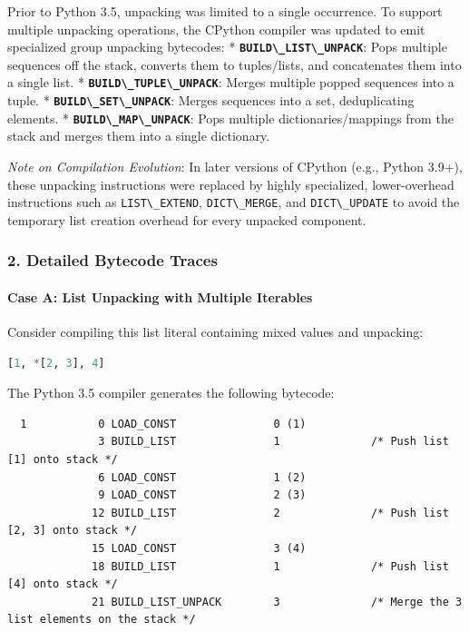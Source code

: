 Prior to Python 3.5, unpacking was limited to a single occurrence. To
support multiple unpacking operations, the CPython compiler was updated
to emit specialized group unpacking bytecodes: *
\textbf{\passthrough{\lstinline!BUILD\_LIST\_UNPACK!}}: Pops multiple
sequences off the stack, converts them to tuples/lists, and concatenates
them into a single list. *
\textbf{\passthrough{\lstinline!BUILD\_TUPLE\_UNPACK!}}: Merges multiple
popped sequences into a tuple. *
\textbf{\passthrough{\lstinline!BUILD\_SET\_UNPACK!}}: Merges sequences
into a set, deduplicating elements. *
\textbf{\passthrough{\lstinline!BUILD\_MAP\_UNPACK!}}: Pops multiple
dictionaries/mappings from the stack and merges them into a single
dictionary.

\emph{Note on Compilation Evolution}: In later versions of CPython
(e.g., Python 3.9+), these unpacking instructions were replaced by
highly specialized, lower-overhead instructions such as
\passthrough{\lstinline!LIST\_EXTEND!},
\passthrough{\lstinline!DICT\_MERGE!}, and
\passthrough{\lstinline!DICT\_UPDATE!} to avoid the temporary list
creation overhead for every unpacked component.

\hypertarget{detailed-bytecode-traces}{%
\subsubsection{2. Detailed Bytecode
Traces}\label{detailed-bytecode-traces}}

\hypertarget{case-a-list-unpacking-with-multiple-iterables}{%
\paragraph{Case A: List Unpacking with Multiple
Iterables}\label{case-a-list-unpacking-with-multiple-iterables}}

Consider compiling this list literal containing mixed values and
unpacking:

\begin{lstlisting}[language=Python]
[1, *[2, 3], 4]
\end{lstlisting}

The Python 3.5 compiler generates the following bytecode:

\begin{lstlisting}
  1           0 LOAD_CONST               0 (1)
              3 BUILD_LIST               1              /* Push list [1] onto stack */
              6 LOAD_CONST               1 (2)
              9 LOAD_CONST               2 (3)
             12 BUILD_LIST               2              /* Push list [2, 3] onto stack */
             15 LOAD_CONST               3 (4)
             18 BUILD_LIST               1              /* Push list [4] onto stack */
             21 BUILD_LIST_UNPACK        3              /* Merge the 3 list elements on the stack */
\end{lstlisting}

